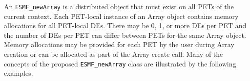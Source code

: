 
An {\tt ESMF\_newArray} is a distributed object that must exist on all PETs of the current context. Each PET-local instance of an Array object contains memory allocations for all PET-local DEs. There may be 0, 1, or more DEs per PET and the number of DEs per PET can differ between PETs for the same Array object. Memory allocations may be provided for each PET by the user during Array creation or can be allocated as part of the Array create call. Many of the concepts of the proposed {\tt ESMF\_newArray} class are illustrated by the following examples.
